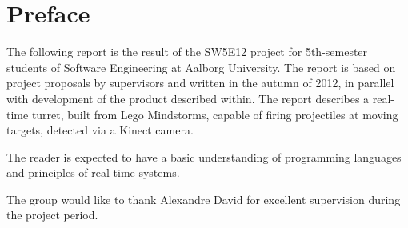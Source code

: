 \chapter*{Preface}
The following report is the result of the SW5E12 project for 5th-semester students of Software Engineering at Aalborg University. The report is based on project proposals by supervisors and written in the autumn of 2012, in parallel with development of the product described within. The report describes a real-time turret, built from Lego Mindstorms, capable of firing projectiles at moving targets, detected via a Kinect camera.

The reader is expected to have a basic understanding of programming languages and principles of real-time systems.

The group would like to thank Alexandre David for excellent supervision during the project period.